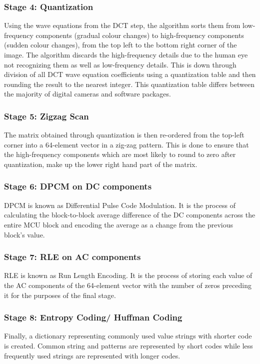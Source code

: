 \subsubsection{Stage 4: Quantization}
Using the wave equations from the DCT step,
the algorithm sorts them from low-frequency
components (gradual colour changes) to 
high-frequency components (sudden colour changes),
from the top left to the bottom right corner of the image.
The algorithm discards the high-frequency details
due to the human eye not recognizing them as
well as low-frequency details. This is down through 
division of all DCT wave equation 
coefficients using a quantization table and
then rounding the result to the nearest integer.
This quantization table differs between
the majority of digital cameras and 
software packages.\cite{hass_impulse_jpeg}

\subsubsection{Stage 5: Zigzag Scan}
The matrix obtained through quantization is
then re-ordered from the top-left corner into a 
64-element vector in a zig-zag pattern.
This is done to ensure that the high-frequency
components which are most likely to round to
zero after quantization, make up the lower
right hand part of the matrix.\cite{hass_impulse_jpeg}

\subsubsection{Stage 6: DPCM on DC components}
DPCM is known as Differential Pulse
Code Modulation. It is the process of
calculating the block-to-block average difference
of the DC components across the entire MCU block
and encoding the average as a change from the 
previous block's value.\cite{hass_impulse_jpeg}

\subsubsection{Stage 7: RLE on AC components}
RLE is known as Run Length Encoding. It is the process of
storing each value of the AC components of the
64-element vector with the number of zeros
preceding it for the purposes of the final stage.\cite{hass_impulse_jpeg}

\subsubsection{Stage 8: Entropy Coding/ Huffman Coding}
Finally, a dictionary representing commonly used value strings with
shorter code is created. Common string and patterns
are represented by short codes while less frequently
used strings are represented with longer codes.

